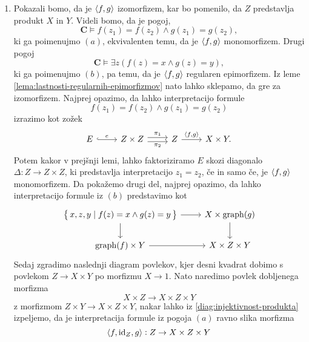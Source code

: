 \documentclass[../kategoricna_logika.tex]{subfiles}
\begin{document}
\begin{dokaz}
\begin{enumerate}[label=(\roman*)]
    \item Pokazali bomo, da je $\langle f,g \rangle$ izomorfizem, kar bo
      pomenilo, da $Z$ predstavlja produkt $X$ in $Y$. Videli bomo, da
      je pogoj,
      \[ \mathbf{C} \models f(z_{1}) = f(z_{2}) \land g(z_{1}) =
        g(z_{2}), \] ki ga poimenujmo \((a)\), ekvivalenten temu, da
      je \( \langle f,g \rangle\) monomorfizem.  Drugi pogoj
      \[ \mathbf{C} \models \exists z(f(z) = x \land g(z) = y), \] ki
      ga poimenujmo \((b)\), pa temu, da je \( \langle f,g \rangle\) regularen
      epimorfizem.  Iz leme
      \ref{lema:lastnosti-regularnih-epimorfizmov} nato lahko
      sklepamo, da gre za izomorfizem.  Najprej opazimo, da lahko
      interpretacijo formule
      \[ f(z_{1}) = f(z_{2}) \land g(z_{1}) = g(z_{2})\] izrazimo kot
      zožek
      \begin{equation*}
        \begin{tikzcd}
          E \ar[r, hook, "e"] & Z \times Z \ar[r, shift left,
          "\pi_{1}"] \ar[r, shift right, "\pi_{2}"'] & Z \ar[r, ,
          "\fprod{f, g}"] & X \times Y.
        \end{tikzcd}
      \end{equation*}
      Potem kakor v prejšnji lemi, lahko faktoriziramo $E$ skozi
      diagonalo $\Delta : Z \to Z \times Z$, ki predstavlja
      interpretacijo $z_{1} = z_{2}$, če in samo če, je $\langle f, g \rangle$
      monomorfizem.  Da pokažemo drugi del, najprej opazimo, da lahko
      interpretacijo formule iz $(b)$ predstavimo kot
      \begin{equation}\label{diag:injektivnost-produkta}
        \begin{tikzcd}
          \set{x,z,y \mid f(z) = x \land g(z) = y} \ar[d] \ar[r] &
          X \times \mathrm{graph}(g) \ar[d] \\
          \mathrm{graph}(f) \times Y \ar[r] & X \times Z \times Y
        \end{tikzcd}
      \end{equation}
      Sedaj zgradimo naslednji diagram povlekov, kjer desni kvadrat
      dobimo s povlekom $Z \to X \times Y$ po morfizmu $X \to 1$. Nato
      naredimo povlek dobljenega morfizma
      \[X \times Z \to X \times Z \times Y\]
      z morfizmom
      $Z \times Y \to X \times Z \times Y$, nakar lahko iz
      \eqref{diag:injektivnost-produkta} izpeljemo, da je
      interpretacija formule iz pogoja $(a)$ ravno slika morfizma
      \[\langle f, \mathrm{id}_{Z}, g \rangle : Z \to X \times Z \times Y\]
      \begin{equation*}
        \begin{tikzcd}[column sep=tiny]

\end{tikzcd}
\end{equation*}
\end{enumerate}
\end{dokaz}
\end{document}
